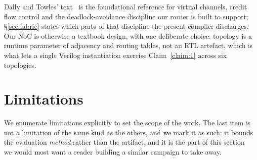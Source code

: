 \documentclass[journal,10pt]{IEEEtran}
\theoremstyle{plain}
\theoremstyle{definition}
\theoremstyle{remark}
\begin{document}
Dally and Towles' text~\cite{dally2004principles} is the foundational
reference for virtual channels, credit flow control and the
deadlock-avoidance discipline our router is built to support;
\S\ref{sec:fabric} states which parts of that discipline the present
compiler discharges. Our NoC is otherwise a textbook design, with one
deliberate choice: topology is a runtime parameter of adjacency and routing
tables, not an RTL artefact, which is what lets a single Verilog
instantiation exercise Claim~\ref{claim:1} across six topologies.

\section{Limitations}\label{sec:limitations}

We enumerate limitations explicitly to set the scope of the work. The last
item is not a limitation of the same kind as the others, and we mark it as
such: it bounds the evaluation \emph{method} rather than the artifact, and it
is the part of this section we would most want a reader building a similar
campaign to take away.
\end{document}
